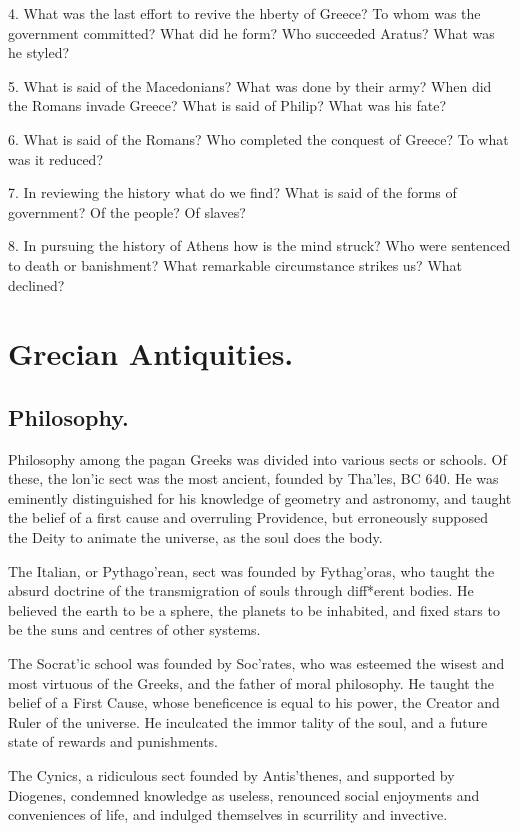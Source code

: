 \documentclass[openany,a4paper]{memoir}
\begin{document}
4. What was the last effort to revive the hberty of Greece? To whom 
was the government committed? What did he form? Who succeeded 
Aratus? What was he styled?

5. What is said of the Macedonians? 
What was done by their army? 
When did the Romans invade Greece? What is said of Philip? 
What was his fate? 

6. What is said of the Romans? Who completed 
the conquest of Greece? To what was it reduced? 

7. In reviewing 
the history what do we find? What is said of the forms of government? 
Of the people? Of slaves?

8. In pursuing the history of Athens how 
is the mind struck? 
Who were sentenced to death or banishment? What remarkable circumstance strikes us? What declined? 


\chapter{Grecian Antiquities.}


\section{Philosophy.}

Philosophy among the pagan Greeks 
was divided into various sects or schools. Of these, the 
lon'ic sect was the most ancient, founded by Tha'les, BC 
640. He was eminently distinguished for his knowledge of 
geometry and astronomy, and taught the belief of a first 
cause and overruling Providence, but erroneously supposed 
the Deity to animate the universe, as the soul does the body. 

The Italian, or Pythago'rean, sect was founded by Fythag'oras, who taught the absurd doctrine of the transmigration 
of souls through diff*erent bodies. He believed the earth to be 
a sphere, the planets to be inhabited, and fixed stars to be 
the suns and centres of other systems. 

The Socrat'ic school was founded by Soc'rates, who was 
esteemed the wisest and most virtuous of the Greeks, and 
the father of moral philosophy. He taught the belief of a 
First Cause, whose beneficence is equal to his power, the Creator and Ruler of the universe. He inculcated the immor
tality of the soul, and a future state of rewards and punishments. 

The Cynics, a ridiculous sect founded by Antis'thenes, and 
supported by Diogenes, condemned knowledge as useless, renounced social enjoyments and conveniences of life, and indulged themselves in scurrility and invective. 
\end{document}
